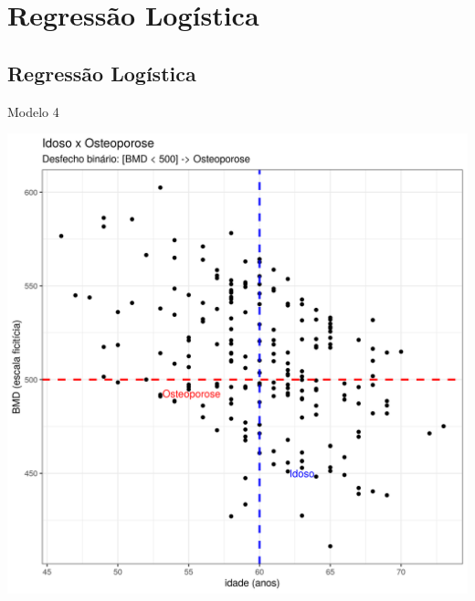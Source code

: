 \documentclass{beamer}
\begin{document}
\section{Regressão Logística}

\subsection{Regressão Logística}

\begin{frame}{\small Modelo 4}
  \begin{center}
    \includegraphics[height=.9\textheight]{Cap31-32/pratica-glm4}
  \end{center}
\end{frame}
\end{document}
